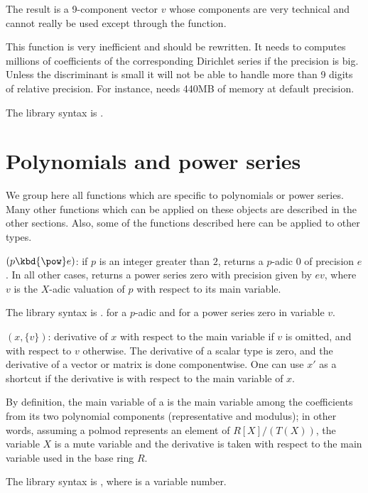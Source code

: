 The result is a 9-component vector $v$ whose components are very technical
and cannot really be used except through the  function.

This function is very inefficient and should be rewritten. It needs to
computes millions of coefficients of the corresponding Dirichlet series if
the precision is big. Unless the discriminant is small it will not be able
to handle more than 9 digits of relative precision. For instance,
 needs 440MB of memory at default precision.

The library syntax is .

\section{Polynomials and power series}

We group here all functions which are specific to polynomials or power
series. Many other functions which can be applied on these objects are
described in the other sections. Also, some of the functions described here
can be applied to other types.


$(p\hbox{\kbd{\pow}}e)$: \label{se:O}if $p$ is an integer
greater than $2$, returns a $p$-adic $0$ of precision $e$. In all other
cases, returns a power series zero with precision given by $e v$, where $v$
is the $X$-adic valuation of $p$ with respect to its main variable.

The library syntax is .
 for a $p$-adic and
 for a power series zero in variable $v$.

$(x,\{v\})$: \label{se:deriv}
derivative of $x$ with respect to the main
variable if $v$ is omitted, and with respect to $v$ otherwise. The derivative
of a scalar type is zero, and the derivative of a vector or matrix is done
componentwise. One can use $x'$ as a shortcut if the derivative is with
respect to the main variable of $x$.

By definition, the main variable of a  is the main variable among
the coefficients from its two polynomial components (representative and
modulus); in other words, assuming a polmod represents an element of
$R[X]/(T(X))$, the variable $X$ is a mute variable and the derivative is
taken with respect to the main variable used in the base ring $R$.

The library syntax is , where  is a variable number.

